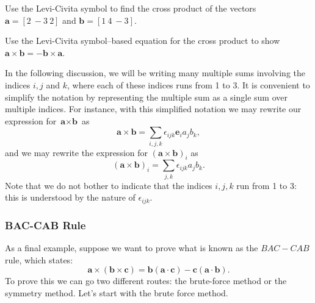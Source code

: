 \begin{exercise}{}
Use the Levi-Civita symbol to find the cross product of the vectors $\textbf{a}=[2~-3~2]$ and $\textbf{b}=[1~4~-3]$.
\end{exercise}

\begin{exercise}{}
Use the Levi-Civita symbol--based equation for the cross product to show $\textbf{a} \times \textbf{b} = -\textbf{b} \times \textbf{a}$.
\end{exercise}   

In the following discussion, we will be writing many multiple sums involving the indices $i,j$ and $k$, where each of these indices runs from 1 to 3. It is convenient to simplify the notation by representing the multiple sum as a single sum over multiple indices. For instance, with this simplified notation we may rewrite our expression for 
$\textbf{a} \times \textbf{b}$ as
\[\textbf{a} \times \textbf{b} =  \sum_{i,j,k} \epsilon_{ijk} \textbf{e}_i  a_j b_k, \]
and we may rewrite the expression for 
$(\textbf{a} \times \textbf{b})_i$ as
\[ (\textbf{a} \times \textbf{b})_i = \sum_{j,k} \epsilon_{ijk} a_j b_k. \]
Note that we do not bother to indicate that the indices $i,j,k$ run from 1 to 3: this is understood by the nature of $\epsilon_{ijk}$.

\subsubsection*{BAC-CAB Rule}
As a final example, suppose we want to prove what is known as the $BAC-CAB$ rule, which states:
\[ \textbf{a} \times \left( \textbf{b} \times \textbf{c} \right) = \textbf{b} \left( \textbf{a} \cdot \textbf{c} \right) - \textbf{c} \left( \textbf{a} \cdot \textbf{b} \right). \]
To prove this we can go two different routes: the brute-force method or the symmetry method.  Let's start with the brute force method.

